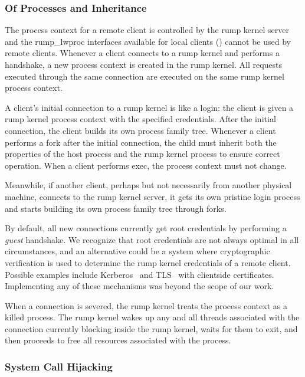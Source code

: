 \subsubsection{Of Processes and Inheritance}

The process context for a remote client is controlled by the rump
kernel server and the rump\_lwproc interfaces available
for local clients () cannot be used by
remote clients.  Whenever a client connects to a rump kernel and
performs a handshake, a new process context is created in the rump
kernel.  All requests executed through the same connection are
executed on the same rump kernel process context.

A client's initial connection to a rump kernel is like a login:
the client is given a rump kernel process context with the
specified credentials.  After the initial connection, the client
builds its own process family tree.  Whenever a client performs a fork
after the initial connection, the child must inherit both the
properties of the host process and the rump kernel process to ensure
correct operation.  When a client performs exec, the process context
must not change.

Meanwhile, if another client, perhaps but not necessarily from
another physical machine, connects to the rump kernel server, it
gets its own pristine login process and starts building its own
process family tree through forks.

By default, all new connections currently get root credentials by
performing a \textit{guest} handshake.  We recognize that root credentials are
not always optimal in all circumstances, and an alternative could be
a system where cryptographic verification is used to
determine the rump kernel credentials of a remote client.  Possible
examples include Kerberos~\cite{kerberos} and TLS~\cite{tls} with
clientside certificates.  Implementing any of these mechanisms was
beyond the scope of our work.

When a connection is severed, the rump kernel treats the process
context as a killed process.  The rump kernel wakes up any and all
threads associated with the connection currently blocking inside
the rump kernel, waits for them to exit, and then proceeds to free
all resources associated with the process.


\subsubsection{System Call Hijacking}

